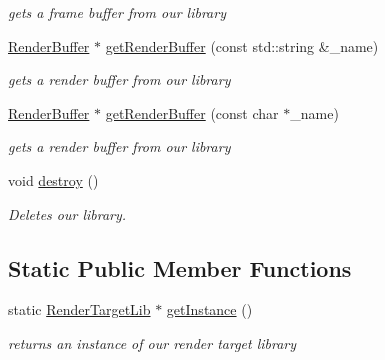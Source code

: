 \begin{DoxyCompactItemize}
\begin{DoxyCompactList}\small\item\em gets a frame buffer from our library \end{DoxyCompactList}\item 
\hypertarget{class_render_target_lib_acf1fa30e68dc74deca512b0c77786d0a}{\hyperlink{class_render_buffer}{Render\-Buffer} $\ast$ \hyperlink{class_render_target_lib_acf1fa30e68dc74deca512b0c77786d0a}{get\-Render\-Buffer} (const std\-::string \&\-\_\-name)}\label{class_render_target_lib_acf1fa30e68dc74deca512b0c77786d0a}

\begin{DoxyCompactList}\small\item\em gets a render buffer from our library \end{DoxyCompactList}\item 
\hypertarget{class_render_target_lib_aeda9a8138eef8e87558431809933074b}{\hyperlink{class_render_buffer}{Render\-Buffer} $\ast$ \hyperlink{class_render_target_lib_aeda9a8138eef8e87558431809933074b}{get\-Render\-Buffer} (const char $\ast$\-\_\-name)}\label{class_render_target_lib_aeda9a8138eef8e87558431809933074b}

\begin{DoxyCompactList}\small\item\em gets a render buffer from our library \end{DoxyCompactList}\item 
\hypertarget{class_render_target_lib_a71b6707d4e877c56cf167bee8995ff6a}{void \hyperlink{class_render_target_lib_a71b6707d4e877c56cf167bee8995ff6a}{destroy} ()}\label{class_render_target_lib_a71b6707d4e877c56cf167bee8995ff6a}

\begin{DoxyCompactList}\small\item\em Deletes our library. \end{DoxyCompactList}\end{DoxyCompactItemize}
\subsection*{Static Public Member Functions}
\begin{DoxyCompactItemize}
\item 
\hypertarget{class_render_target_lib_a99e969c4379b3c037b3152ae4603e436}{static \hyperlink{class_render_target_lib}{Render\-Target\-Lib} $\ast$ \hyperlink{class_render_target_lib_a99e969c4379b3c037b3152ae4603e436}{get\-Instance} ()}\label{class_render_target_lib_a99e969c4379b3c037b3152ae4603e436}

\begin{DoxyCompactList}\small\item\em returns an instance of our render target library \end{DoxyCompactList}\end{DoxyCompactItemize}


